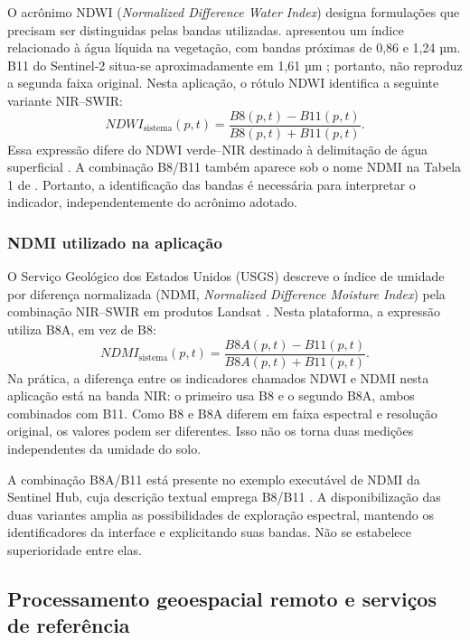 O acrônimo NDWI (\textit{Normalized Difference Water Index}) designa formulações que precisam ser distinguidas pelas bandas utilizadas. \citet{GAO1996} apresentou um índice relacionado à água líquida na vegetação, com bandas próximas de 0,86 e 1,24 µm. B11 do Sentinel-2 situa-se aproximadamente em 1,61 µm \citep{GOOGLE_S2_SR}; portanto, não reproduz a segunda faixa original. Nesta aplicação, o rótulo NDWI identifica a seguinte variante NIR--SWIR:
\begin{equation}\label{eq:ndwi-final}
 NDWI_{\mathrm{sistema}}(p,t)=
 \frac{B8(p,t)-B11(p,t)}{B8(p,t)+B11(p,t)}.
\end{equation}
Essa expressão difere do NDWI verde--NIR destinado à delimitação de água superficial \citep{MCFEETERS1996}. A combinação B8/B11 também aparece sob o nome NDMI na Tabela 1 de \citet{IZQUIERDO2026}. Portanto, a identificação das bandas é necessária para interpretar o indicador, independentemente do acrônimo adotado.

\subsubsection{NDMI utilizado na aplicação}

O Serviço Geológico dos Estados Unidos (USGS) descreve o índice de umidade por diferença normalizada (NDMI, \textit{Normalized Difference Moisture Index}) pela combinação NIR--SWIR em produtos Landsat \citep{USGS_NDMI}. Nesta plataforma, a expressão utiliza B8A, em vez de B8:
\begin{equation}\label{eq:ndmi-final}
 NDMI_{\mathrm{sistema}}(p,t)=
 \frac{B8A(p,t)-B11(p,t)}{B8A(p,t)+B11(p,t)}.
\end{equation}
Na prática, a diferença entre os indicadores chamados NDWI e NDMI nesta aplicação está na banda NIR: o primeiro usa B8 e o segundo B8A, ambos combinados com B11. Como B8 e B8A diferem em faixa espectral e resolução original, os valores podem ser diferentes. Isso não os torna duas medições independentes da umidade do solo.

A combinação B8A/B11 está presente no exemplo executável de NDMI da Sentinel Hub, cuja descrição textual emprega B8/B11 \citep{SENTINELHUB_NDMI}. A disponibilização das duas variantes amplia as possibilidades de exploração espectral, mantendo os identificadores da interface e explicitando suas bandas. Não se estabelece superioridade entre elas.

\subsection{Processamento geoespacial remoto e serviços de referência}

